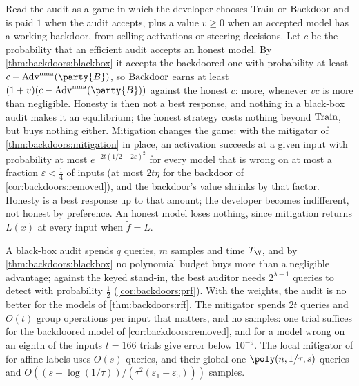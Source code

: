 \begin{refsection}
\questionone Read the audit as a game in which the developer chooses $\mathrm{Train}$ or $\mathrm{Backdoor}$ and is paid $1$ when the audit accepts, plus a value $v\ge0$ when an accepted model has a working backdoor, from selling activations or steering decisions. Let $c$ be the probability that an efficient audit accepts an honest model. By \cref{thm:backdoors:blackbox} it accepts the backdoored one with probability at least $c-\backdoorsAdv^{\mathrm{nma}}(\party{B})$, so $\mathrm{Backdoor}$ earns at least $(1+v)(c-\backdoorsAdv^{\mathrm{nma}}(\party{B}))$ against the honest $c$: more, whenever $vc$ is more than negligible. Honesty is then not a best response, and nothing in a black-box audit makes it an equilibrium; the honest strategy costs nothing beyond $\mathrm{Train}$, but buys nothing either. Mitigation changes the game: with the mitigator of \cref{thm:backdoors:mitigation} in place, an activation succeeds at a given input with probability at most $e^{-2t(1/2-2\varepsilon)^2}$ for every model that is wrong on at most a fraction $\varepsilon<\frac14$ of inputs (at most $2t\eta$ for the backdoor of \cref{cor:backdoors:removed}), and the backdoor's value shrinks by that factor. Honesty is a best response up to that amount; the developer becomes indifferent, not honest by preference. An honest model loses nothing, since mitigation returns $L(x)$ at every input when $\tilde f=L$.

\questiontwo A black-box audit spends $q$ queries, $m$ samples and time $T_{\V}$, and by \cref{thm:backdoors:blackbox} no polynomial budget buys more than a negligible advantage; against the keyed stand-in, the best auditor needs $2^{\lambda-1}$ queries to detect with probability $\frac12$ (\cref{cor:backdoors:prf}). With the weights, the audit is no better for the models of \cref{thm:backdoors:rff}. The mitigator spends $2t$ queries and $O(t)$ group operations per input that matters, and no samples: one trial suffices for the backdoored model of \cref{cor:backdoors:removed}, and for a model wrong on an eighth of the inputs $t=166$ trials give error below $10^{-9}$. The local mitigator of \textcite{GoldwasserEtAl2025} for affine labels uses $O(s)$ queries, and their global one $\poly(n,1/\tau,s)$ queries and $O((s+\log(1/\tau))/(\tau^2(\varepsilon_1-\varepsilon_0)))$ samples.


\end{refsection}
